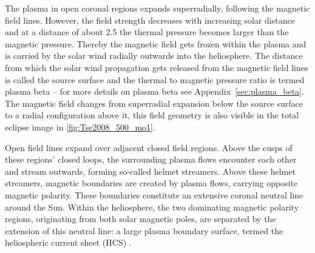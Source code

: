 The plasma in open coronal regions expands superradially, following the magnetic field lines. However, the field strength decreases with increasing solar distance and at a distance of about \SI{2.5}{\Rs} the thermal pressure becomes larger than the magnetic pressure. Thereby the magnetic field gets frozen within the plasma and is carried by the solar wind radially outwards into the heliosphere. The distance from which the solar wind propagation gets released from the magnetic field lines is called the source surface \citep{Schatten1969} and the thermal to magnetic pressure ratio is termed plasma beta -- for more details on plasma beta see Appendix~\ref{sec:plasma_beta}. The magnetic field changes from superradial expansion below the source surface to a radial configuration above it, this field geometry is also visible in the total eclipse image in \autoref{fig:Tse2008_500_mo1}.

Open field lines expand over adjacent closed field regions. Above the cusps of these regions' closed loops, the surrounding plasma flows encounter each other and stream outwards, forming so-called helmet streamers. Above these helmet streamers, magnetic boundaries are created by plasma flows, carrying opposite magnetic polarity. These boundaries constitute an extensive coronal neutral line around the Sun. Within the heliosphere, the two dominating magnetic polarity regions, originating from both solar magnetic poles, are separated by the extension of this neutral line: a large plasma boundary surface, termed the heliospheric current sheet (HCS) \citep{Smith2001}.

